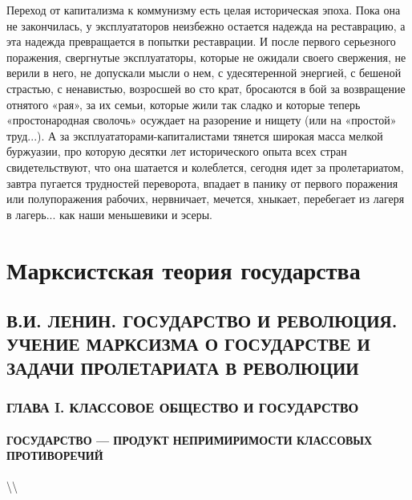 \documentclass[12pt]{article}
\newcommand\ellipsis{%
  \textbackslash\thinspace\textellipsis\textbackslash
}
\newcommand\resetparcount{%
  \setcounter{parcount}{0}
}
\newcommand{\parnum}{(\arabic{parcount})}
\newcounter{parcount}
\newenvironment{parnumbers}{%
  \par%
  \everypar{\noindent \stepcounter{parcount}\marginpar[]{\parnum}}%
}{}
\begin{document}
\begin{parnumbers}
Переход от капитализма к коммунизму есть целая историческая эпоха. Пока она не закончилась, у эксплуататоров неизбежно остается надежда на реставрацию, а эта надежда превращается в попытки реставрации. И после первого серьезного поражения, свергнутые эксплуататоры, которые не ожидали своего свержения, не верили в него, не допускали мысли о нем, с удесятеренной энергией, с бешеной страстью, с ненавистью, возросшей во сто крат, бросаются в бой за возвращение отнятого «рая», за их семьи, которые жили так сладко и которые теперь «простонародная сволочь» осуждает на разорение и нищету (или на «простой» труд...). А за эксплуататорами-капиталистами тянется широкая масса мелкой буржуазии, про которую десятки лет исторического опыта всех стран свидетельствуют, что она шатается и колеблется, сегодня идет за пролетариатом, завтра пугается трудностей переворота, впадает в панику от первого поражения или полупоражения рабочих, нервничает, мечется, хныкает, перебегает из лагеря в лагерь... как наши меньшевики и эсеры.
\end{parnumbers}


\section{Марксистская теория государства}
\resetparcount
\subsection{В.И. ЛЕНИН.
ГОСУДАРСТВО И РЕВОЛЮЦИЯ.
УЧЕНИЕ МАРКСИЗМА О ГОСУДАРСТВЕ И ЗАДАЧИ ПРОЛЕТАРИАТА В РЕВОЛЮЦИИ}
\subsubsection*{ГЛАВА I. КЛАССОВОЕ ОБЩЕСТВО И ГОСУДАРСТВО}
\paragraph{ГОСУДАРСТВО — ПРОДУКТ НЕПРИМИРИМОСТИ КЛАССОВЫХ ПРОТИВОРЕЧИЙ}

\ellipsis
\end{document}
